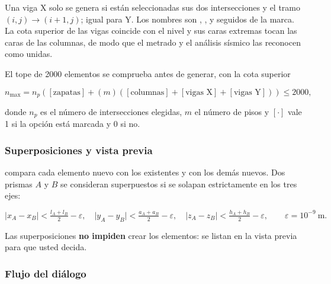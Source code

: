 Una viga X solo se genera si están seleccionadas sus dos intersecciones y el tramo $(i,j) \rightarrow (i{+}1,j)$; igual
para Y. Los nombres son , ,  y  seguidos de la marca. La cota
superior de las vigas coincide con el nivel y sus caras extremas tocan las caras de las columnas, de modo que el
metrado y el análisis sísmico las reconocen como unidas.

El tope de 2000 elementos se comprueba antes de generar, con la cota superior

\begin{equation}
	n_{\max} = n_p \left( [\text{zapatas}] + (m) \left( [\text{columnas}] + [\text{vigas X}] + [\text{vigas Y}] \right) \right) \le 2000,
\end{equation}

\noindent donde $n_p$ es el número de intersecciones elegidas, $m$ el número de pisos y $[\cdot]$ vale 1 si la opción
está marcada y 0 si no.

\subsubsection{Superposiciones y vista previa}

 compara cada elemento nuevo con los existentes y con los demás nuevos. Dos
prismas $A$ y $B$ se consideran superpuestos si se solapan estrictamente en los tres ejes:

\begin{equation}
	\lvert x_A - x_B \rvert < \tfrac{l_A + l_B}{2} - \varepsilon, \quad
	\lvert y_A - y_B \rvert < \tfrac{a_A + a_B}{2} - \varepsilon, \quad
	\lvert z_A - z_B \rvert < \tfrac{h_A + h_B}{2} - \varepsilon, \qquad \varepsilon = 10^{-9}\ \text{m}.
	\label{eq:mod-superposicion}
\end{equation}

Las superposiciones \textbf{no impiden} crear los elementos: se listan en la vista previa para que usted decida.

\subsubsection{Flujo del diálogo}


